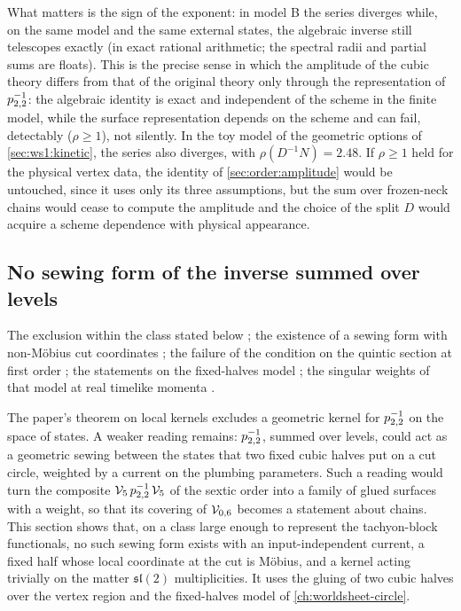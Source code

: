 What matters is the sign of the exponent: in model B the series diverges while, on the same model and the same external states, the algebraic inverse still telescopes exactly (in exact rational arithmetic; the spectral radii and partial sums are floats).
This is the precise sense in which the amplitude of the cubic theory differs from that of the original theory only through the representation of $p_{2,2}^{-1}$: the algebraic identity is exact and independent of the scheme in the finite model, while the surface representation depends on the scheme and can fail, detectably ($\rho \ge 1$), not silently.
In the toy model of the geometric options of \cref{sec:ws1:kinetic}, the series also diverges, with $\rho(D^{-1} N) = 2.48$.
If $\rho \ge 1$ held for the physical vertex data, the identity of \cref{sec:order:amplitude} would be untouched, since it uses only its three assumptions, but the sum over frozen-neck chains would cease to compute the amplitude and the choice of the split $D$ would acquire a scheme dependence with physical appearance.

\subsection{No sewing form of the inverse summed over levels}
\label{sec:ws1:sewing}

The exclusion within the class stated below ; the existence of a sewing form with non-Möbius cut coordinates ; the failure of the condition on the quintic section at first order ; the statements on the fixed-halves model ; the singular weights of that model at real timelike momenta .

The paper's theorem on local kernels excludes a geometric kernel for $p_{2,2}^{-1}$ on the space of states.
A weaker reading remains: $p_{2,2}^{-1}$, summed over levels, could act as a geometric sewing between the states that two fixed cubic halves put on a cut circle, weighted by a current on the plumbing parameters.
Such a reading would turn the composite $\mathcal{V}_{5} \, p_{2,2}^{-1} \, \mathcal{V}_{5}$ of the sextic order into a family of glued surfaces with a weight, so that its covering of ${\mathcal{V}}_{0, 6}$ becomes a statement about chains.
This section shows that, on a class large enough to represent the tachyon-block functionals, no such sewing form exists with an input-independent current, a fixed half whose local coordinate at the cut is Möbius, and a kernel acting trivially on the matter $\mathfrak{sl}(2)$ multiplicities.
It uses the gluing of two cubic halves over the vertex region and the fixed-halves model of \cref{ch:worldsheet-circle}.

